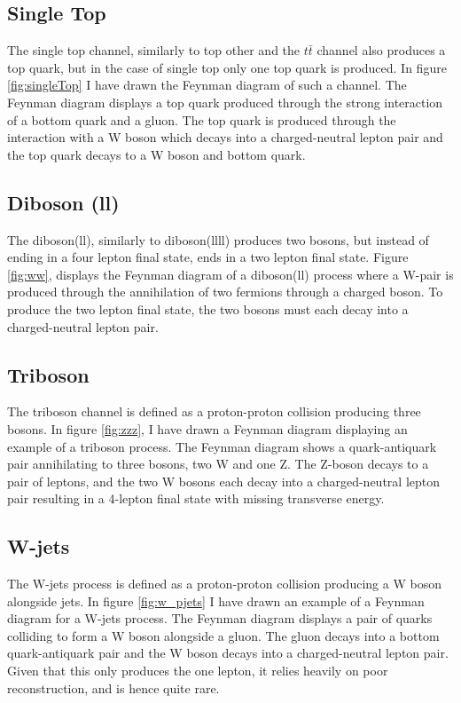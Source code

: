 \subsection*{Single Top}
The single top channel, similarly to top other and the $t\bar{t}$ channel also produces a top quark, but in the case of single top 
only one top quark is produced. In figure \ref{fig:singleTop} I have drawn the Feynman diagram of such a channel. The Feynman diagram displays a
top quark produced through the strong interaction of a bottom quark and a gluon. The top quark is produced through the interaction with a W boson 
which decays into a charged-neutral lepton pair and the top quark decays to a W boson and bottom quark. 

\subsection*{Diboson (ll)}
The diboson(ll), similarly to diboson(llll) produces two bosons, but instead of ending in a four lepton final state, ends in a two lepton final state.
Figure \ref{fig:ww}, displays the Feynman diagram of a diboson(ll) process where a W-pair is produced through the annihilation of two fermions through 
a charged boson. To produce the two lepton final state, the two bosons must each decay into a charged-neutral lepton pair. 

\subsection*{Triboson}
The triboson channel is defined as a proton-proton collision producing three bosons.  In figure \ref{fig:zzz}, I have drawn a Feynman diagram 
displaying an example of a triboson process. The Feynman diagram shows a quark-antiquark pair annihilating to three bosons, two W and one Z. The Z-boson decays 
to a pair of leptons, and the two W bosons each decay into a charged-neutral lepton pair resulting in a 4-lepton final state with missing transverse energy.

\subsection*{W-jets}
The W-jets process is defined as a proton-proton collision producing a W boson alongside jets. In figure \ref{fig:w_pjets} I have drawn an example 
of a Feynman diagram for a W-jets process. The Feynman diagram displays a pair of quarks colliding to form a W boson alongside a gluon. The gluon decays 
into a bottom quark-antiquark pair and the W boson decays into a charged-neutral lepton pair. Given that this only produces the one lepton, it 
relies heavily on poor reconstruction, and is hence quite rare.

